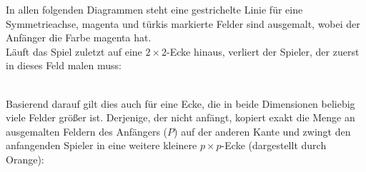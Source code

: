 \documentclass[12pt,a4paper,oneside]{article}
\begin{document}
In allen folgenden Diagrammen steht eine gestrichelte Linie für eine Symmetrieachse, magenta und türkis markierte Felder sind ausgemalt, wobei der Anfänger die Farbe magenta hat.
\\[10pt]
Läuft das Spiel zuletzt auf eine $2\times2$-Ecke hinaus, verliert der Spieler, der zuerst in dieses Feld malen muss: \\
\\
Basierend darauf gilt dies auch für eine Ecke, die in beide Dimensionen beliebig viele Felder größer ist. Derjenige, der nicht anfängt, kopiert exakt die Menge an ausgemalten Feldern des Anfängers ($P$) auf der anderen Kante und zwingt den anfangenden Spieler in eine weitere kleinere $p\times p$-Ecke (dargestellt durch Orange):
\\
\end{document}
